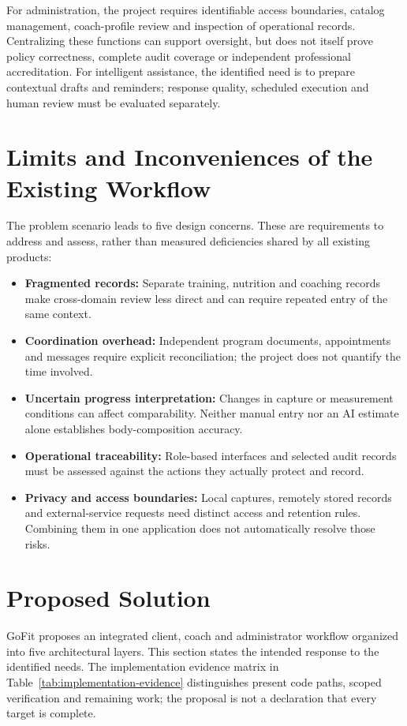 \documentclass[12pt,a4paper,openany]{report}
\begin{document}
For administration, the project requires identifiable access boundaries, catalog management, coach-profile review and inspection of operational records. Centralizing these functions can support oversight, but does not itself prove policy correctness, complete audit coverage or independent professional accreditation. For intelligent assistance, the identified need is to prepare contextual drafts and reminders; response quality, scheduled execution and human review must be evaluated separately.

\section{Limits and Inconveniences of the Existing Workflow}

The problem scenario leads to five design concerns. These are requirements to address and assess, rather than measured deficiencies shared by all existing products:

\begin{itemize}
    \item \textbf{Fragmented records:} Separate training, nutrition and coaching records make cross-domain review less direct and can require repeated entry of the same context.
    \item \textbf{Coordination overhead:} Independent program documents, appointments and messages require explicit reconciliation; the project does not quantify the time involved.
    \item \textbf{Uncertain progress interpretation:} Changes in capture or measurement conditions can affect comparability. Neither manual entry nor an AI estimate alone establishes body-composition accuracy.
    \item \textbf{Operational traceability:} Role-based interfaces and selected audit records must be assessed against the actions they actually protect and record.
    \item \textbf{Privacy and access boundaries:} Local captures, remotely stored records and external-service requests need distinct access and retention rules. Combining them in one application does not automatically resolve those risks.
\end{itemize}

\section{Proposed Solution}

GoFit proposes an integrated client, coach and administrator workflow organized into five architectural layers. This section states the intended response to the identified needs. The implementation evidence matrix in Table~\ref{tab:implementation-evidence} distinguishes present code paths, scoped verification and remaining work; the proposal is not a declaration that every target is complete.
\end{document}
